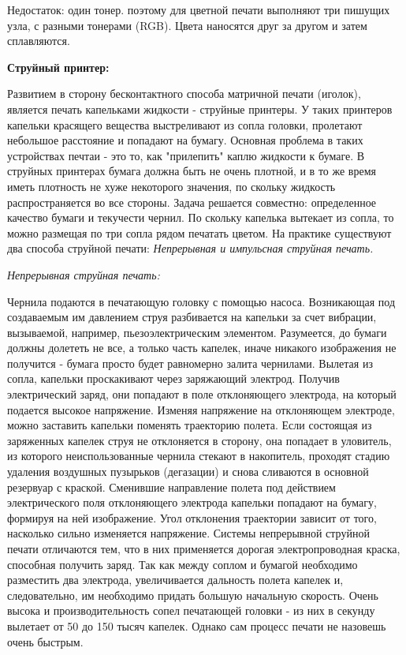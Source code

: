 \documentclass[unicode, 12pt, a4paper, oneside]{article}
\begin{document}
Недостаток: один тонер. поэтому для цветной печати выполняют три пишущих узла, с разными тонерами (RGB). Цвета наносятся друг за другом  и затем сплавляются. 

{\bf Струйный принтер:}

Развитием в сторону бесконтактного способа матричной печати (иголок), является печать капельками жидкости - струйные принтеры. У таких принтеров капельки красящего вещества выстреливают из сопла головки, пролетают небольшое расстояние и попадают на бумагу. Основная проблема в таких устройствах печтаи - это то, как "прилепить" каплю жидкости к бумаге. В струйных принтерах бумага должна быть не очень плотной, и в то же время иметь плотность не хуже некоторого значения, по скольку жидкость распространяется во все стороны. Задача решается совместно: определенное качество бумаги и текучести чернил. По скольку капелька вытекает из сопла, то можно размещая по три сопла рядом печатать цветом. На практике существуют два способа струйной печати: {\sl Непрерывная и импульсная струйная печать.}

{\sl Непрерывная струйная печать:}

Чернила подаются в печатающую головку с помощью насоса. Возникающая под создаваемым им давлением струя разбивается на капельки за счет вибрации, вызываемой, например, пьезоэлектрическим элементом. Разумеется, до бумаги должны долететь не все, а только часть капелек, иначе никакого изображения не получится - бумага просто будет равномерно залита чернилами.
Вылетая из сопла, капельки проскакивают через заряжающий электрод. Получив электрический заряд, они попадают в поле отклоняющего электрода, на который подается высокое напряжение. Изменяя напряжение на отклоняющем электроде, можно заставить капельки поменять траекторию полета. Если состоящая из заряженных капелек струя не отклоняется в сторону, она попадает в уловитель, из которого неиспользованные чернила стекают в накопитель, проходят стадию удаления воздушных пузырьков (дегазации) и снова сливаются в основной резервуар с краской.
Сменившие направление полета под действием электрического поля отклоняющего электрода капельки попадают на бумагу, формируя на ней изображение. Угол отклонения траектории зависит от того, насколько сильно изменяется напряжение.
Системы непрерывной струйной печати отличаются тем, что в них применяется дорогая электропроводная краска, способная получить заряд. Так как между соплом и бумагой необходимо разместить два электрода, увеличивается дальность полета капелек и, следовательно, им необходимо придать большую начальную скорость. Очень высока и производительность сопел печатающей головки - из них в секунду вылетает от 50 до 150 тысяч капелек. Однако сам процесс печати не назовешь очень быстрым.
\end{document}
